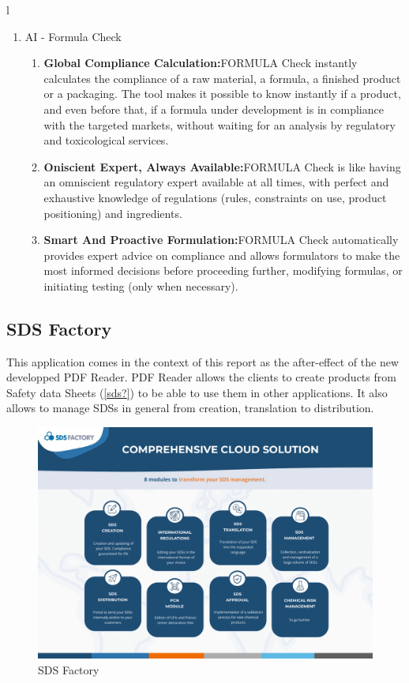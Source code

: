 l\documentclass[a4paper,12pt,twoside]{report}
\begin{document}
\begin{enumerate}
\begin{enumerate}
\begin{itemize}
	\end{itemize}	
	\end{enumerate}
\item AI - Formula Check
	\begin{enumerate}
		\item \textbf{Global Compliance Calculation:}FORMULA Check instantly calculates the compliance of a raw 
material, a formula, a finished product or a packaging. The tool 
makes it possible to know instantly if a product, and even before that, if 
a formula under development is in compliance with the targeted 
markets, without waiting for an analysis by regulatory and toxicological 
services.
		\item \textbf{Oniscient Expert, Always Available:}FORMULA Check is like having an omniscient regulatory expert 
available at all times, with perfect and exhaustive knowledge of 
regulations (rules, constraints on use, product positioning) and 
ingredients.

		\item \textbf{Smart And Proactive Formulation:}FORMULA Check automatically provides expert advice on 
compliance and allows formulators to make the most informed 
decisions before proceeding further, modifying formulas, or initiating 
testing (only when necessary).
	\end{enumerate}
\end{enumerate}



\subsection{SDS Factory}
This application comes in the context of this report as the after-effect of the new developped PDF Reader. PDF Reader allows the clients to create products from Safety data Sheets (\ref{sds?}) to be able to use them in other applications. It also allows to manage SDSs in general from creation, translation to distribution.
\begin{figure}[H]
		\includegraphics[width=\textwidth]{images/sdsFactory}
	\caption[SDS Factory]{SDS Factory}
	\label{sdsfactory}
\end{figure}
\end{document}
